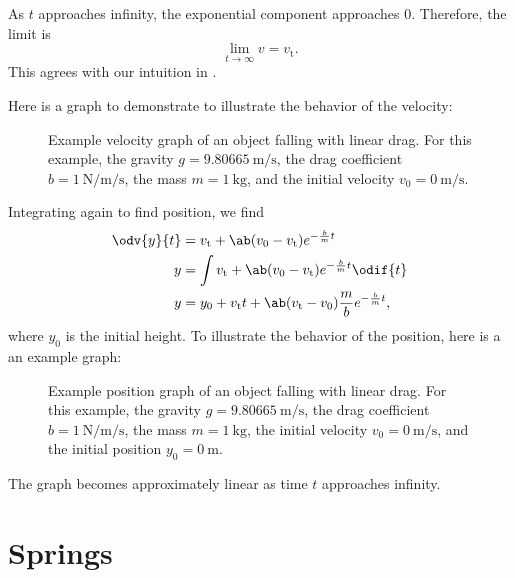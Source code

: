 As \(t\) approaches infinity, the exponential component approaches 0.
Therefore, the limit is
\begin{equation*}
    \lim_{t \to \infty} v = v_\mathrm{t}.
\end{equation*}
This agrees with our intuition in .

Here is a graph to demonstrate to illustrate the behavior of the velocity:
\begin{figure}[ht]
    \centering
    \resizebox{\textwidth}{!}{}
    \caption{
        Example velocity graph of an object falling with linear drag.
        For this example,
        the gravity \(g = \qty{9.80665}{\metre \per \second}\),
        the drag coefficient \(b = \qty{1}{\newton \per \metre \per \second}\),
        the mass \(m = \qty{1}{\kilogram}\),
        and the initial velocity \(v_0 = \qty{0}{\metre \per \second}\).
    }
\end{figure}

Integrating again to find position, we find
\begin{equation}
    \begin{aligned}
        \odv{y}{t} &= v_\mathrm{t} + \ab(v_0 - v_\mathrm{t}) e^{-
        \frac{b}{m} t} \\
        y &= \int v_\mathrm{t} + \ab(v_0 - v_\mathrm{t}) e^{-
        \frac{b}{m} t} \odif{t} \\
        y &= y_0
        + v_\mathrm{t} t
        + \ab(v_\mathrm{t} - v_0)
        \frac{m}{b}
        e^{- \frac{b}{m} t},
    \end{aligned}
\end{equation}
where \(y_0\) is the initial height.
To illustrate the behavior of the position, here is a an example graph:
\begin{figure}[ht]
    \centering
    \resizebox{\textwidth}{!}{}
    \caption{
        Example position graph of an object falling with linear drag.
        For this example,
        the gravity \(g = \qty{9.80665}{\metre \per \second}\),
        the drag coefficient \(b = \qty{1}{\newton \per \metre \per \second}\),
        the mass \(m = \qty{1}{\kilogram}\),
        the initial velocity \(v_0 = \qty{0}{\metre \per \second}\),
        and the initial position \(y_0 = \qty{0}{\metre}\).
    }
\end{figure}
The graph becomes approximately linear as time \(t\) approaches infinity.

\section{Springs}

